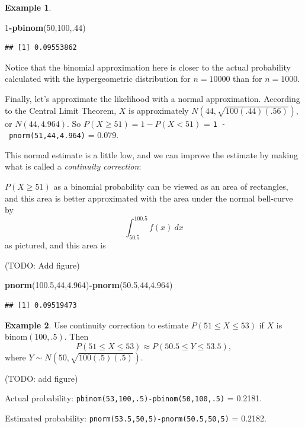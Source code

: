 \documentclass[
]{book}
\newenvironment{Shaded}{\begin{snugshade}}{\end{snugshade}}
\newcommand{\DecValTok}[1]{\textcolor[rgb]{0.00,0.00,0.81}{#1}}
\newcommand{\FloatTok}[1]{\textcolor[rgb]{0.00,0.00,0.81}{#1}}
\newcommand{\FunctionTok}[1]{\textcolor[rgb]{0.13,0.29,0.53}{\textbf{#1}}}
\newcommand{\NormalTok}[1]{#1}
\newcommand{\SpecialCharTok}[1]{\textcolor[rgb]{0.81,0.36,0.00}{\textbf{#1}}}
\theoremstyle{definition}
\theoremstyle{definition}
\newtheorem{example}{Example}[chapter]
\theoremstyle{definition}
\theoremstyle{definition}
\theoremstyle{remark}
\begin{document}
\begin{example}
\begin{Shaded}
\begin{Highlighting}[]
\DecValTok{1}\SpecialCharTok{{-}}\FunctionTok{pbinom}\NormalTok{(}\DecValTok{50}\NormalTok{,}\DecValTok{100}\NormalTok{,.}\DecValTok{44}\NormalTok{)}
\end{Highlighting}
\end{Shaded}

\begin{verbatim}
## [1] 0.09553862
\end{verbatim}

Notice that the binomial approximation here is closer to the actual probability calculated with the hypergeometric distribution for \(n = 10000\) than for \(n = 1000\).

Finally, let's approximate the likelihood with a normal approximation.
According to the Central Limit Theorem, \(X\) is approximately \(N(44,\sqrt{100(.44)(.56)})\), or \(N(44,4.964)\).
So \(P(X \geq 51) = 1 - P(X < 51)\) = \texttt{1\ -\ pnorm(51,44,4.964)} = 0.079.

This normal estimate is a little low, and we can improve the estimate by making what is called a \emph{continuity correction}:

\(P(X \geq 51)\) as a binomial probability can be viewed as an area of rectangles, and this area is better approximated with the area under the normal bell-curve by \[\int_{50.5}^{100.5} f(x)~dx\] as pictured, and this area is

(TODO: Add figure)

\begin{Shaded}
\begin{Highlighting}[]
\FunctionTok{pnorm}\NormalTok{(}\FloatTok{100.5}\NormalTok{,}\DecValTok{44}\NormalTok{,}\FloatTok{4.964}\NormalTok{)}\SpecialCharTok{{-}}\FunctionTok{pnorm}\NormalTok{(}\FloatTok{50.5}\NormalTok{,}\DecValTok{44}\NormalTok{,}\FloatTok{4.964}\NormalTok{)}
\end{Highlighting}
\end{Shaded}

\begin{verbatim}
## [1] 0.09519473
\end{verbatim}

\end{example}

\begin{example}
Use continuity correction to estimate \(P(51 \leq X \leq 53)\) if \(X\) is binom\((100,.5)\). Then
\[P(51 \leq X \leq 53) \approx P(50.5 \leq Y \leq 53.5),\] where \(Y \sim N(50,\sqrt{100(.5)(.5)})\).

(TODO: add figure)

Actual probability: \texttt{pbinom(53,100,.5)-pbinom(50,100,.5)} = 0.2181.

Estimated probability: \texttt{pnorm(53.5,50,5)-pnorm(50.5,50,5)} = 0.2182.
\end{example}
\end{document}
